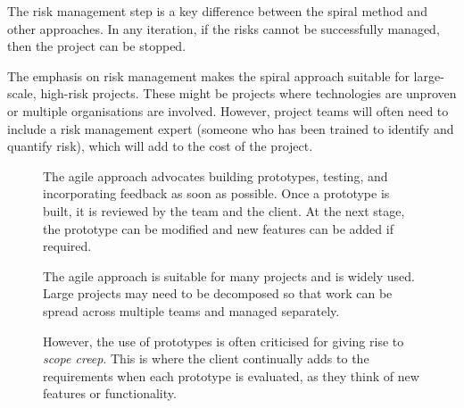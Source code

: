 \documentclass[../main.tex]{subfile}
\begin{document}
The risk management step is a key difference between the spiral method and other approaches. In any iteration, if the risks cannot be successfully managed, then the project can be stopped.

The emphasis on risk management makes the spiral approach suitable for large-scale, high-risk projects. These might be projects where technologies are unproven or multiple organisations are involved. However, project teams will often need to include a risk management expert (someone who has been trained to identify and quantify risk), which will add to the cost of the project.


\begin{figure}[H]
	\begin{minipage}{0.55\linewidth}\setlength{\parskip}{2ex}
		The agile approach advocates building prototypes, testing, and incorporating feedback as soon as possible. Once a prototype is built, it is reviewed by the team and the client. At the next stage, the prototype can be modified and new features can be added if required.

		The agile approach is suitable for many projects and is widely used. Large projects may need to be decomposed so that work can be spread across multiple teams and managed separately.

		However, the use of prototypes is often criticised for giving rise to \textit{scope creep}. This is where the client continually adds to the requirements when each prototype is evaluated, as they think of new features or functionality.
	\end{minipage}\hfill
	\begin{minipage}{0.4\linewidth}
		\centering
	\end{minipage}
\end{figure}
\end{document}
